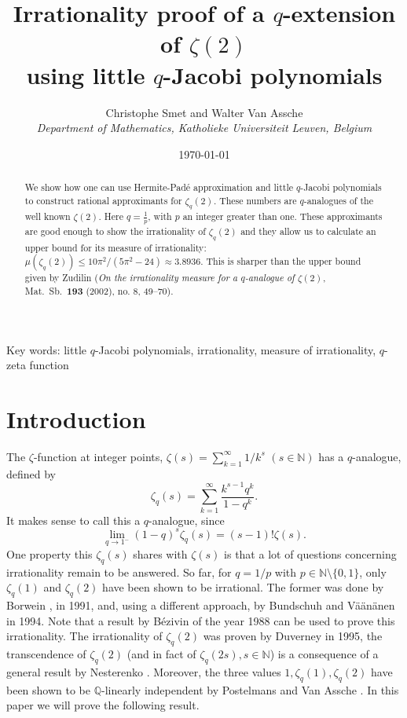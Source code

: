 \documentclass[12pt]{article}
\numberwithin{equation}{section}
\begin{document}
\title{Irrationality proof of a $q$-extension of $\zeta(2)$ \\ using little
        $q$-Jacobi polynomials}
\author{Christophe Smet and Walter Van Assche \\
    \em Department of Mathematics, Katholieke Universiteit Leuven, Belgium}
\date{\today}
\maketitle
\begin{abstract}
We show how one can use Hermite-Pad\'{e} approximation and little
$q$-Jacobi polynomials to construct rational approximants for
$\zeta_q(2)$.  These numbers are $q$-analogues of the
well known $\zeta(2)$.  Here $q=\frac{1}{p}$, with $p$ an
integer greater than one.  These approximants are good enough to
show the irrationality of $\zeta_q(2)$ and they allow
us to calculate an upper bound for its measure of irrationality:
$\mu\left(\zeta_q(2)\right)\leq 10\pi^2/(5\pi^2-24) \approx 3.8936$.  This is sharper than
the upper bound given by Zudilin (\textit{On the irrationality measure for
a $q$-analogue of $\zeta(2)$}, Mat.\ Sb.\  \textbf{193} (2002), no. 8, 49--70).
\end{abstract}

Key words: little $q$-Jacobi polynomials, irrationality, measure
of irrationality, $q$-zeta function


\section{Introduction}

The $\zeta$-function at integer points,
$\zeta(s)=\sum_{k=1}^\infty 1/k^s$ $(s \in \mathbb{N})$ has a
$q$-analogue, defined by
\[\zeta_q(s)=\sum_{k=1}^\infty
\frac{k^{s-1}q^k}{1-q^k}.\]
It makes sense to call this a
$q$-analogue, since
\[\lim_{q\rightarrow1^-}(1-q)^s\zeta_q(s)=(s-1)!\zeta(s).\]
One property this $\zeta_q(s)$ shares with $\zeta(s)$ is that a
lot of questions concerning irrationality remain to be answered.
So far, for $q=1/p$ with $p\in \mathbb{N}\setminus\{0,1\}$, only
$\zeta_q(1)$ and $\zeta_{q}(2)$ have been shown to be irrational.
The former was done by Borwein \cite{bor1a},\cite{bor1b} in 1991,
and, using a different approach, by Bundschuh and
V\"{a}\"{a}n\"{a}nen \cite{buva} in 1994.  Note that a result by
B\'{e}zivin \cite{bezivin} of the year 1988 can be used to prove
this irrationality.  The irrationality of $\zeta_q(2)$ was proven
by Duverney \cite{duv} in 1995, the transcendence of $\zeta_q(2)$
(and in fact of $\zeta_q(2s), s\in\mathbb{N}$) is a consequence of
a general result by Nesterenko \cite{nes}.  Moreover, the three
values $1,\zeta_q(1),\zeta_{q}(2)$ have been shown to be
$\mathbb{Q}$-linearly independent by Postelmans and Van Assche
\cite{kelly}. In this paper we will prove the following result.
\end{document}

